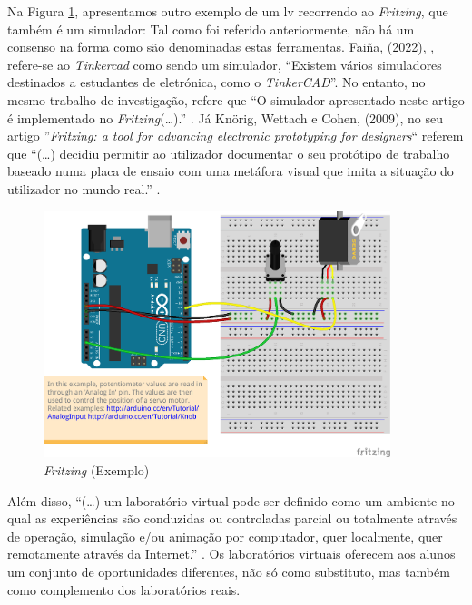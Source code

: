 Na Figura \ref{fig:fritzing}, apresentamos outro exemplo de um \acrshort{lv} recorrendo ao \textit{Fritzing}, que também é um simulador: Tal como foi referido anteriormente, não há um consenso na forma como são denominadas estas ferramentas. Faiña, (2022), \cite{faina}, refere-se ao \textit{Tinkercad} como sendo um simulador, ``Existem vários simuladores destinados a estudantes de eletrónica, como o \textit{TinkerCAD}''. No entanto, no mesmo trabalho de investigação, refere que ``O simulador apresentado neste artigo é implementado no \textit{Fritzing}(\ldots).'' \cite{faina}. Já Knörig, Wettach e Cohen, (2009), no seu artigo ''\textit{Fritzing: a tool for advancing electronic prototyping for designers}`` referem que ``(\ldots) decidiu permitir ao utilizador documentar o seu protótipo de trabalho baseado numa placa de ensaio com uma metáfora visual que imita a situação do utilizador no mundo real.'' \cite{Knorig2009Feb}.

\begin{figure}[hbtp]
    \centering
    \includegraphics[width=0.9\textwidth]{figures/AnalogInputToServo_bb.png}
    \caption{\textit{Fritzing} (Exemplo)}
    \label{fig:fritzing}
\end{figure}

Além disso, ``(\ldots) um laboratório virtual pode ser definido como um ambiente no qual as experiências são conduzidas ou controladas parcial ou totalmente através de operação, simulação e/ou animação por computador, quer localmente, quer remotamente através da Internet.'' \cite{EvaluatingLearningExperiencesVirtualLaboratoryHongKong}. Os laboratórios virtuais oferecem aos alunos um conjunto de oportunidades diferentes, não só como substituto, mas também como complemento dos laboratórios reais.

